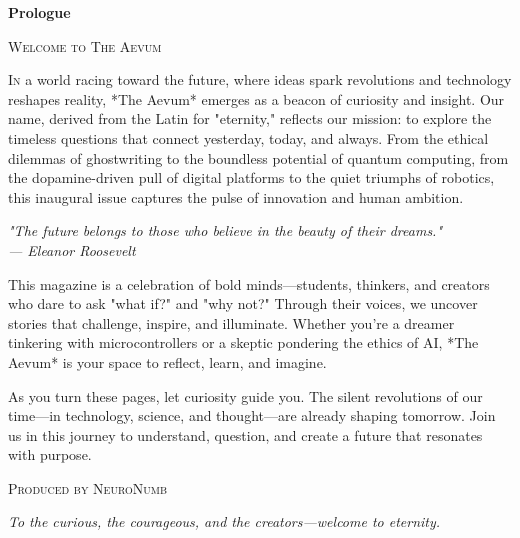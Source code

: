 \documentclass[a4paper,10pt,twocolumn]{memoir}
\newenvironment{magquote}
  {\begin{shaded*}\itshape\small}
  {\end{shaded*}}
\begin{document}
\begin{center}
\vspace*{1cm}

{\Huge\bfseries\color{primary}Prologue}

\vspace{0.5cm}

\vspace{0.5cm}
{\large\scshape\color{dark}Welcome to The Aevum}

\vspace{0.3cm}
\end{center}

\lettrine[lines=3]{I}{n} a world racing toward the future, where ideas spark revolutions and technology reshapes reality, *The Aevum* emerges as a beacon of curiosity and insight. Our name, derived from the Latin for "eternity," reflects our mission: to explore the timeless questions that connect yesterday, today, and always. From the ethical dilemmas of ghostwriting to the boundless potential of quantum computing, from the dopamine-driven pull of digital platforms to the quiet triumphs of robotics, this inaugural issue captures the pulse of innovation and human ambition.

\begin{magquote}
"The future belongs to those who believe in the beauty of their dreams." \\
\hfill --- Eleanor Roosevelt
\end{magquote}

This magazine is a celebration of bold minds---students, thinkers, and creators who dare to ask "what if?" and "why not?" Through their voices, we uncover stories that challenge, inspire, and illuminate. Whether you're a dreamer tinkering with microcontrollers or a skeptic pondering the ethics of AI, *The Aevum* is your space to reflect, learn, and imagine.

As you turn these pages, let curiosity guide you. The silent revolutions of our time---in technology, science, and thought---are already shaping tomorrow. Join us in this journey to understand, question, and create a future that resonates with purpose.

\vspace{0.3cm}
{\small\scshape\color{gray}Produced by NeuroNumb}

\vspace*{\fill}
{\large\itshape\color{dark}To the curious, the courageous, and the creators---welcome to eternity.}
\end{document}
